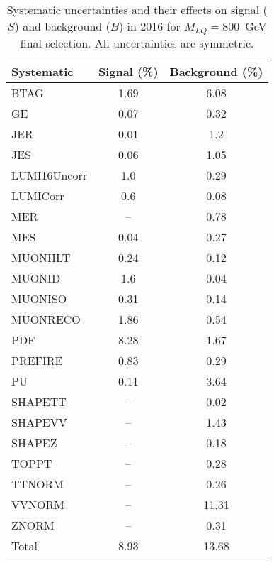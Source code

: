 \begin{table}[htbp]
\begin{center}
\caption{Systematic uncertainties and their effects on signal ($S$) and background ($B$) in 2016 for $M_{LQ}=800$~GeV final selection. All uncertainties are symmetric.}
\begin{tabular}{lcc}
\hline\hline
Systematic & Signal (\%) & Background (\%) \\ \hline 
BTAG & 1.69 & 6.08\\ 
GE & 0.07 & 0.32\\ 
JER & 0.01 & 1.2\\ 
JES & 0.06 & 1.05\\ 
LUMI16Uncorr & 1.0 & 0.29\\ 
LUMICorr & 0.6 & 0.08\\ 
MER & -- & 0.78\\ 
MES & 0.04 & 0.27\\ 
MUONHLT & 0.24 & 0.12\\ 
MUONID & 1.6 & 0.04\\ 
MUONISO & 0.31 & 0.14\\ 
MUONRECO & 1.86 & 0.54\\ 
PDF & 8.28 & 1.67\\ 
PREFIRE & 0.83 & 0.29\\ 
PU & 0.11 & 3.64\\ 
SHAPETT & -- & 0.02\\ 
SHAPEVV & -- & 1.43\\ 
SHAPEZ & -- & 0.18\\ 
TOPPT & -- & 0.28\\ 
TTNORM & -- & 0.26\\ 
VVNORM & -- & 11.31\\ 
ZNORM & -- & 0.31\\ 
Total & 8.93 & 13.68\\ \hline \hline
\end{tabular}
\label{tab:SysUncertainties_uujj_800}
\end{center}
\end{table}

